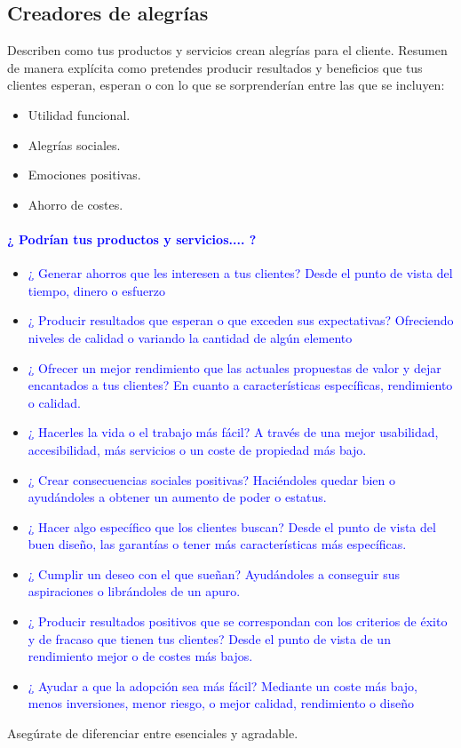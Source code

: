 \documentclass[11pt]{book}
\begin{document}
\subsection{Creadores de alegrías}
Describen como tus productos y servicios crean alegrías para el cliente. Resumen de manera explícita como pretendes producir resultados y beneficios que tus clientes esperan, esperan o con lo que se sorprenderían entre las que se incluyen:
\begin{itemize}
\item Utilidad funcional.
\item Alegrías sociales.
\item Emociones positivas.
\item Ahorro de costes.
\end{itemize}

\paragraph{\textcolor{blue}{¿ Podrían tus productos y servicios.... ?}}
\begin{itemize}
\item \textcolor{blue}{¿ Generar ahorros que les interesen a tus clientes? Desde el
punto de vista del tiempo, dinero o esfuerzo}
\item \textcolor{blue}{¿ Producir resultados que esperan o que exceden sus
expectativas? Ofreciendo niveles de calidad o variando la
cantidad de algún elemento}
\item \textcolor{blue}{¿ Ofrecer un mejor rendimiento que las actuales propuestas de valor y dejar encantados
a tus clientes? En cuanto a características específicas, rendimiento o calidad.}
\item \textcolor{blue}{¿ Hacerles la vida o el trabajo más fácil? A través de una mejor usabilidad,
accesibilidad, más servicios o un coste de propiedad más bajo.
}
\item \textcolor{blue}{¿ Crear consecuencias sociales positivas? Haciéndoles quedar bien
o ayudándoles a obtener un aumento de poder o estatus.}
\item \textcolor{blue}{¿ Hacer algo específico que los clientes buscan? Desde el punto de vista del
buen diseño, las garantías o tener más características más específicas.}
\item \textcolor{blue}{¿ Cumplir un deseo con el que sueñan? Ayudándoles a conseguir
sus aspiraciones o librándoles de un apuro.}
\item \textcolor{blue}{¿ Producir resultados positivos que se correspondan con los criterios de éxito
y de fracaso que tienen tus clientes? Desde el punto de vista de un
rendimiento mejor o de costes más bajos.}
\item \textcolor{blue}{¿ Ayudar a que la adopción sea más fácil? Mediante un coste más bajo,
menos inversiones, menor riesgo, o mejor calidad, rendimiento o diseño}
\end{itemize}
Asegúrate de diferenciar entre esenciales y agradable.
\end{document}
